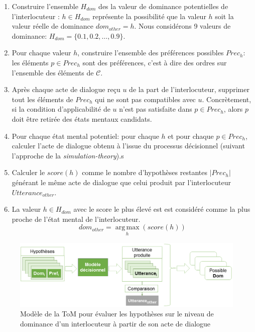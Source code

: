 \begin{enumerate}
	\item Construire l'ensemble $H_{dom}$ des la valeur de dominance potentielles de l'interlocuteur : $h\in H_{dom}$ représente la possibilité que la valeur $h$ soit la valeur réelle de dominance $dom_{other}=h$. Nous considérons 9 valeurs de dominance: $H_{dom}=\{0.1, 0.2, \ldots, 0.9\}$.
	
	\item Pour chaque valeur $h$, construire l'ensemble des préférences possibles $Prec_h$: les éléments $p\in Prec_h$ sont des préférences, c'est à dire des ordres sur l'ensemble des éléments de $\mathcal{C}$.
	
	\item Après chaque acte de dialogue reçu $u$ de la part de l'interlocuteur, supprimer tout les éléments de $Prec_h$ qui ne sont pas compatibles avec $u$. Concrètement, si la condition d'applicabilité de $u$ n'est pas satisfaite dans $p \in Prec_h$, alors $p$ doit être retirée des états mentaux candidats.
	\item Pour chaque état mental potentiel: pour chaque $h$ et pour chaque $p \in  Prec_h$,  calculer l'acte de dialogue obtenu à l'issue du processus décisionnel (suivant l'approche de la \emph{simulation-theory}).s
	\item Calculer le $score(h)$ comme le nombre d'hypothèses restantes $|Prec_h|$ générant le même acte de dialogue que celui produit par l'interlocuteur $Utterance_{other}$. 
	\item 	La valeur $h \in H_{dom}$ avec le score le plus élevé est est considéré comme la plus proche de l'état mental de l'interlocuteur.
	$$dom_{other} = \operatorname*{arg\,max}_{h} (score(h))$$
\end{enumerate}

	\begin{figure}
		\centering
		\includegraphics[width=\linewidth]{Figures/chap5/model/tom_select.PNG}
		\caption{Modèle de la ToM pour évaluer les hypothèses sur le niveau de dominance d'un interlocuteur à partir de son acte de dialogue} 
		\label{fig:tom}
	\end{figure} 
	
